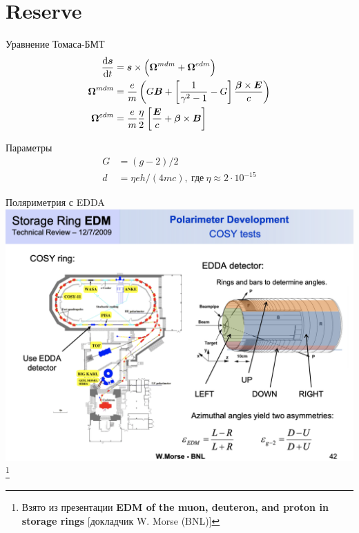 \documentclass[14pt]{beamer}
\newcommand\blfootnote[1]{%
	\begingroup
	\renewcommand\thefootnote{}\footnote{#1}%
	\addtocounter{footnote}{-1}%
	\endgroup
}
\newcommand{\Wedm}{\W^{edm}}
\newcommand{\Wmdm}{\W^{mdm}}
\begin{document}
\section{Reserve}
\begin{frame}{}%
	\begin{block}{Уравнение Томаса-БМТ}
		\begin{align*}
			\frac{\rd \vec s}{\rd t} &= \vec s \times \left(\vec\Wmdm + \vec\Wedm\right)\\
			\vec\Wmdm &= \frac em\left(G\vec B + \left[\frac{1}{\gamma^2-1}-G\right]\frac{\vec\beta\times\vec E}{c}\right)\\
			\vec\Wedm &= \frac em\frac\eta2\left[\frac{\vec E}{c} + \vec\beta\times\vec B\right]
		\end{align*}
	\end{block}
\begin{block}{Параметры}
	\begin{align*}
		G &= (g-2)/2 \tag{аномальный магнитный момент}\\
		d &= \eta eh/(4mc), ~\text{где}~ \eta \approx 2\cdot 10^{-15} \tag{ЭДМ}
	\end{align*}
\end{block}
\end{frame}
\begin{frame}{Поляриметрия с EDDA}
	\centering
	\includegraphics[height=.7\paperheight]{polarimeter_EDDA}
	\blfootnote{Взято из презентации \textbf{EDM of the muon, deuteron, and proton in storage rings} [докладчик W. Morse (BNL)]}
\end{frame}
\end{document}
